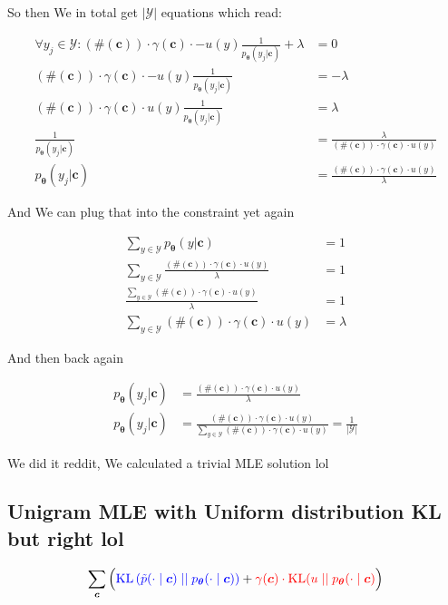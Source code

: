 \documentclass{article}
\newcommand{\KL}{\mathrm{KL}}
\newcommand{\uniform}{u}
\newcommand{\vtheta}{\boldsymbol{\theta}}
\newcommand{\model}{p_{\vtheta}}
\newcommand{\context}{\boldsymbol{c}}
\begin{document}
			So then We in total get $|\mathcal{Y}|$ equations which read:
			
			\begin{align}
				 \forall y_j\in\mathcal{Y}:(\#(\context))\cdot \gamma(\context)\cdot    - u(y)\frac{1}{\model(y_j|\context)} + \lambda &= 0\\
				(\#(\context))\cdot \gamma(\context)\cdot - u(y)\frac{1}{\model(y_j|\context)}  &= -\lambda\\
				(\#(\context))\cdot \gamma(\context)\cdot u(y)\frac{1}{\model(y_j|\context)}  &= \lambda\\
				\frac{1}{\model(y_j|\context)}  &= \frac{\lambda}{(\#(\context))\cdot \gamma(\context)\cdot u(y)}\\
				\model(y_j|\context)  &= \frac{(\#(\context))\cdot \gamma(\context)\cdot u(y)}{\lambda}
			\end{align}
			
			And We can plug that into the constraint yet again
			
			\begin{align}
				\sum_{y\in\mathcal{Y}} \model(y|\context) &= 1\\
				\sum_{y\in\mathcal{Y}} \frac{(\#(\context))\cdot \gamma(\context)\cdot u(y)}{\lambda} &= 1\\
				 \frac{\sum_{y\in\mathcal{Y}} (\#(\context))\cdot \gamma(\context)\cdot u(y)}{\lambda} &= 1\\
				 \sum_{y\in\mathcal{Y}} (\#(\context))\cdot \gamma(\context)\cdot u(y) &= \lambda
			\end{align}
			
			And then back again
			
			\begin{align}
				\model(y_j|\context)  &= \frac{(\#(\context))\cdot \gamma(\context)\cdot u(y)}{\lambda}\\
				\model(y_j|\context)  &= \frac{(\#(\context))\cdot \gamma(\context)\cdot u(y)}{\sum_{y\in\mathcal{Y}} (\#(\context))\cdot \gamma(\context)\cdot u(y)} = \frac{1}{|\mathcal{Y}|}
			\end{align}
			
			We did it reddit, We calculated a trivial MLE solution lol
			
	\subsection{Unigram MLE with Uniform distribution KL but right lol}
	
		\begin{align}
	  		\sum_{\context} \Big( {\color{blue} \KL\left(\tilde{p}(\cdot 			\mid \context) \mid\mid \model(\cdot \mid \context)					\right)} + {\color{red}\gamma(\context) \cdot 						\KL(\uniform \mid\mid \model(\cdot \mid \context)}\Big)
		\end{align}
		
\end{document}

